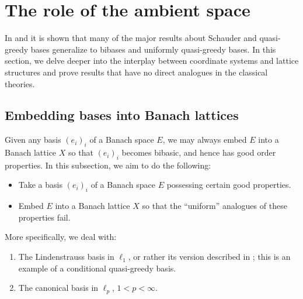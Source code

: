 \documentclass[12pt,leqno]{amsart}
\numberwithin{equation}{section}
\theoremstyle{definition}
\newcommand{\fbl}{\mathrm{FBL}}
\begin{document}





\section{The role of the ambient space}\label{s:destroy}
In \cite{TT19} and  it is shown that many of the major results about Schauder and quasi-greedy bases generalize to bibases and uniformly quasi-greedy bases. In this section, we delve deeper into the interplay between coordinate systems and lattice structures and prove  results that have no direct analogues in the classical theories.
\subsection{Embedding bases into Banach lattices}\label{embed bad}
Given any basis $(e_i)_i$ of a Banach space $E$, we may always embed $E$ into a Banach lattice $X$ so that $(e_i)_i$ becomes bibasic, and hence has good order properties. In this subsection, we aim to do the following: %
\begin{itemize}
 \item Take a basis $(e_i)_i$ of a Banach space $E$ possessing certain good properties.
 \item Embed $E$ into a Banach lattice $X$ so that the ``uniform'' analogues of these properties fail. 
\end{itemize}
More specifically, we deal with:
\begin{enumerate}
 \item 
 The Lindenstrauss basis in $\ell_1$, or rather its version described in \cite{DM}; this is an example of a conditional quasi-greedy basis.
 \item
 The canonical basis in $\ell_p$, $1<p<\infty$.
\end{enumerate}
\end{document}
